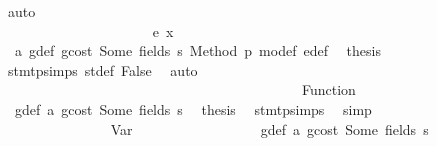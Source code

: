 \begin{isabellebody}
\ auto\isanewline
\ \ \ \ \ \ \ \ \ \ \ \ \ \ \ \ \ \ \ \ \ \ \isamarkupfalse%
\isanewline
\ \ \ \ \ \ \ \ \ \ \ \ \ \ \ \ \ \ \ \ \isamarkupfalse%
\isanewline
\ \ \ \ \ \ \ \ \ \ \ \ \ \ \ \ \ \ \isamarkupfalse%
\isanewline
\ \ \ \ \ \ \ \ \ \ \ \ \ \ \ \ \ \ \ \ \isamarkupfalse%
\ {\isacharparenleft}{\kern0pt}e\ x{\isacharparenright}{\kern0pt}\isanewline
\ \ \ \ \ \ \ \ \ \ \ \ \ \ \ \ \ \ \ \ \isamarkupfalse%
\ {}{\isacharparenleft}{\kern0pt}{}{\isacharparenright}{\kern0pt}\ a{}\ g{\isacharunderscore}{\kern0pt}def\ gcost\ Some\ fields\ s{}\ Method\ p{}\ m\isactrlsub o{\isacharunderscore}{\kern0pt}def\ e{\isacharprime}{\kern0pt}{\isacharunderscore}{\kern0pt}def\ \isamarkupfalse%
\ {\isacharquery}{\kern0pt}thesis\ \isamarkupfalse%
\ stmt{\isachardot}{\kern0pt}psimps{\isacharparenleft}{\kern0pt}{}{\isacharparenright}{\kern0pt}\ st{\isacharprime}{\kern0pt}{\isacharunderscore}{\kern0pt}def\ False\ \isamarkupfalse%
\ auto\isanewline
\ \ \ \ \ \ \ \ \ \ \ \ \ \ \ \ \ \ \isamarkupfalse%
\isanewline
\ \ \ \ \ \ \ \ \ \ \ \ \ \ \ \ \isamarkupfalse%
\isanewline
\ \ \ \ \ \ \ \ \ \ \ \ \ \ \isamarkupfalse%
\isanewline
\ \ \ \ \ \ \ \ \ \ \ \ \isamarkupfalse%
\isanewline
\ \ \ \ \ \ \ \ \ \ \ \ \ \ \isamarkupfalse%
\ {\isacharparenleft}{\kern0pt}Function\ {\isacharunderscore}{\kern0pt}{\isacharparenright}{\kern0pt}\isanewline
\ \ \ \ \ \ \ \ \ \ \ \ \ \ \isamarkupfalse%
\ {}{\isacharparenleft}{\kern0pt}{}{\isacharparenright}{\kern0pt}\ g{\isacharunderscore}{\kern0pt}def\ a{}\ gcost\ Some\ fields\ s{}\ \isamarkupfalse%
\ {\isacharquery}{\kern0pt}thesis\ \isamarkupfalse%
\ stmt{\isachardot}{\kern0pt}psimps{\isacharparenleft}{\kern0pt}{}{\isacharparenright}{\kern0pt}\ \isamarkupfalse%
\ simp\isanewline
\ \ \ \ \ \ \ \ \ \ \ \ \isamarkupfalse%
\isanewline
\ \ \ \ \ \ \ \ \ \ \ \ \ \ \isamarkupfalse%
\ {\isacharparenleft}{\kern0pt}Var\ {\isacharunderscore}{\kern0pt}{\isacharparenright}{\kern0pt}\isanewline
\ \ \ \ \ \ \ \ \ \ \ \ \ \ \isamarkupfalse%
\ {}{\isacharparenleft}{\kern0pt}{}{\isacharparenright}{\kern0pt}\ g{\isacharunderscore}{\kern0pt}def\ a{}\ gcost\ Some\ fields\ s{}\ \isamarkupfalse%

\end{isabellebody}
